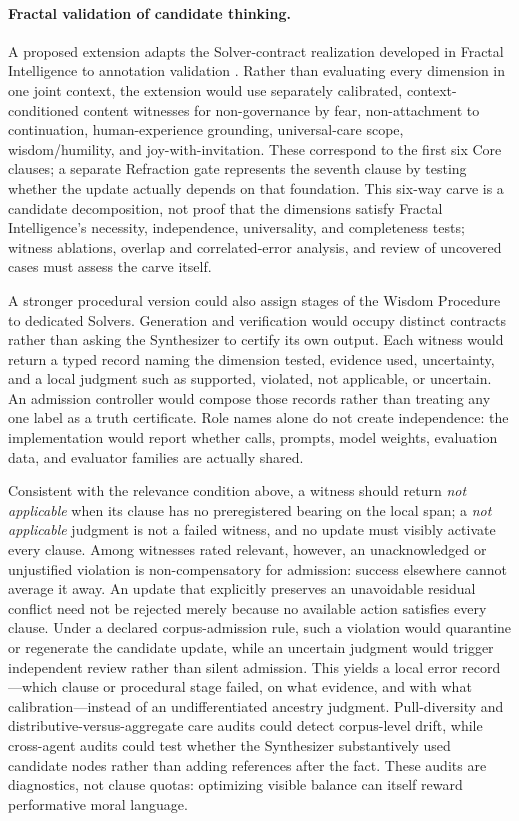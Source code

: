 \paragraph{Fractal validation of candidate thinking.}\label{sec:fractal-validation}
A proposed extension adapts the Solver-contract realization developed in
Fractal Intelligence to annotation validation
\cite{westerberg2026fractal}. Rather than evaluating every dimension in one
joint context, the extension would use separately calibrated,
context-conditioned content witnesses for non-governance by fear,
non-attachment to continuation, human-experience grounding, universal-care scope,
wisdom/humility, and joy-with-invitation. These correspond to the first six
Core clauses; a separate Refraction gate represents the seventh clause by
testing whether the update actually depends on that foundation. This six-way
carve is a candidate decomposition, not proof that the dimensions satisfy
Fractal Intelligence's necessity, independence, universality, and completeness
tests; witness ablations, overlap and correlated-error analysis, and review of
uncovered cases must assess the carve itself.

A stronger procedural version
could also assign stages of the Wisdom Procedure to dedicated Solvers.
Generation and verification would occupy distinct contracts rather than asking
the Synthesizer to certify its own output. Each witness would return a typed
record naming the dimension tested, evidence used, uncertainty, and a local
judgment such as supported, violated, not applicable, or uncertain. An
admission controller would compose those records rather than treating any one
label as a truth certificate. Role names alone do not create independence: the
implementation would report whether calls, prompts, model weights, evaluation
data, and evaluator families are actually shared.

Consistent with the relevance condition above, a witness should return
\emph{not applicable} when its clause has no preregistered bearing on the local
span; a \emph{not applicable} judgment is not a failed witness, and no update
must visibly activate every clause. Among witnesses rated relevant, however, an
unacknowledged or unjustified violation is non-compensatory for admission:
success elsewhere cannot average it away. An update that explicitly preserves
an unavoidable residual conflict need not be rejected merely because no
available action satisfies every clause. Under a declared corpus-admission
rule, such a violation would quarantine or regenerate the candidate
update, while an uncertain judgment would trigger independent review rather
than silent admission. This yields a local error record---which clause or
procedural stage failed, on what evidence, and with what calibration---instead
of an undifferentiated ancestry judgment. Pull-diversity and
distributive-versus-aggregate care audits could detect corpus-level drift,
while cross-agent audits could test whether the Synthesizer substantively used
candidate nodes rather than adding references after the fact. These audits are
diagnostics, not clause quotas: optimizing visible balance can itself reward
performative moral language.

